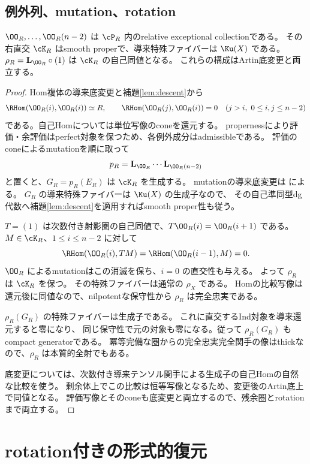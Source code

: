 \subsection{例外列、mutation、rotation}

\begin{proposition}\label{prop:relative-pair}
 \(\OO_R,\ldots,\OO_R(n-2)\) は \(\cP_R\) 内のrelative exceptional collectionである。
 その右直交 \(\cK_R\) はsmooth properで、導来特殊ファイバーは \(\Ku(X)\) である。
 \(\rho_R=\mathbf L_{\OO_R}\circ(1)\) は \(\cK_R\) の自己同値となる。
 これらの構成はArtin底変更と両立する。
\end{proposition}
\begin{proof}
 Hom複体の導来底変更と補題\ref{lem:descent}から
 \[
 \RHom(\OO_R(i),\OO_R(i))\simeq R,\qquad
 \RHom(\OO_R(j),\OO_R(i))=0\quad(j>i,\ 0\le i,j\le n-2)
 \]
 である。自己Homについては単位写像のconeを還元する。
 propernessにより評価・余評価はperfect対象を保つため、各例外成分はadmissibleである。
 評価のconeによるmutationを順に取って
 \[
 p_R=\mathbf L_{\OO_R}\cdots\mathbf L_{\OO_R(n-2)}
 \]
 と置くと、\(G_R=p_R(E_R)\) は \(\cK_R\) を生成する。
 mutationの導来底変更は \cite[Lemma 5.14]{DDL} による。
 \(G_R\) の導来特殊ファイバーは \(\Ku(X)\) の生成子なので、
 その自己準同型dg代数へ補題\ref{lem:descent}を適用すればsmooth proper性も従う。

 \(T=(1)\) は次数付き射影圏の自己同値で、\(T\OO_R(i)=\OO_R(i+1)\) である。
 \(M\in\cK_R\)、\(1\le i\le n-2\) に対して
 \[
 \RHom(\OO_R(i),TM)=\RHom(\OO_R(i-1),M)=0.
 \]
 \(\OO_R\) によるmutationはこの消滅を保ち、\(i=0\) の直交性も与える。
 よって \(\rho_R\) は \(\cK_R\) を保つ。
 その特殊ファイバーは通常の \(\rho_X\) である。
 Homの比較写像は還元後に同値なので、nilpotentな保守性から
 \(\rho_R\) は完全忠実である。

 \(\rho_R(G_R)\) の特殊ファイバーは生成子である。
 これに直交するInd対象を導来還元すると零になり、
 同じ保守性で元の対象も零になる。従って \(\rho_R(G_R)\) もcompact generatorである。
 冪等完備な圏からの完全忠実完全関手の像はthickなので、\(\rho_R\) は本質的全射でもある。

 底変更については、次数付き導来テンソル関手による生成子の自己Homの自然な比較を使う。
 剰余体上でこの比較は恒等写像となるため、変更後のArtin底上で同値となる。
 評価写像とそのconeも底変更と両立するので、残余圏とrotationまで両立する。
\end{proof}

\section{rotation付きの形式的復元}\label{sec:formal}

